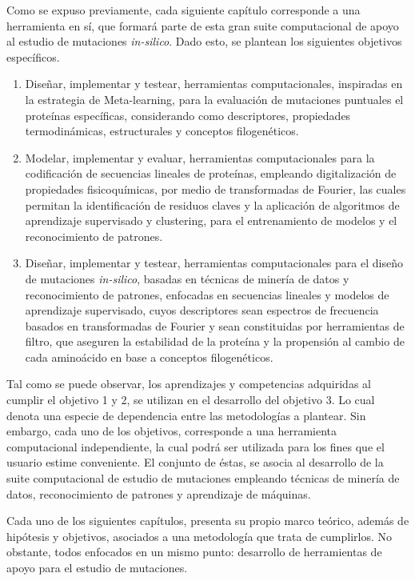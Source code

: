 Como se expuso previamente, cada siguiente capítulo corresponde a una herramienta en sí, que formará parte de esta gran suite computacional de apoyo al estudio de mutaciones \textit{in-silico}. Dado esto, se plantean los siguientes objetivos específicos.

\begin{enumerate}
	
	\item Diseñar, implementar y testear, herramientas computacionales, inspiradas en la estrategia de Meta-learning, para la evaluación de mutaciones puntuales el proteínas específicas, considerando como descriptores, propiedades termodinámicas, estructurales y conceptos filogenéticos. 
	
	\item Modelar, implementar y evaluar, herramientas computacionales para la codificación de secuencias lineales de proteínas, empleando digitalización de propiedades fisicoquímicas, por medio de transformadas de Fourier, las cuales permitan la identificación de residuos claves y la aplicación de algoritmos de aprendizaje supervisado y clustering, para el entrenamiento de modelos y el reconocimiento de patrones.
	
	\item Diseñar, implementar y testear, herramientas computacionales para el diseño de mutaciones \textit{in-silico}, basadas en técnicas de minería de datos y reconocimiento de patrones, enfocadas en secuencias lineales y modelos de aprendizaje supervisado, cuyos descriptores sean espectros de frecuencia basados en transformadas de Fourier y sean constituidas por herramientas de filtro, que aseguren la estabilidad de la proteína y la propensión al cambio de cada aminoácido en base a conceptos filogenéticos.
	
\end{enumerate}

Tal como se puede observar, los aprendizajes y competencias adquiridas al cumplir el objetivo 1 y 2, se utilizan en el desarrollo del objetivo 3. Lo cual denota una especie de dependencia entre las metodologías a plantear. Sin embargo, cada uno de los objetivos, corresponde a una herramienta computacional independiente, la cual podrá ser utilizada para los fines que el usuario estime conveniente. El conjunto de éstas, se asocia al desarrollo de la suite computacional de estudio de mutaciones empleando técnicas de minería de datos, reconocimiento de patrones y aprendizaje de máquinas.

Cada uno de los siguientes capítulos, presenta su propio marco teórico, además de hipótesis y objetivos, asociados a una metodología que trata de cumplirlos. No obstante, todos enfocados en un mismo punto: desarrollo de herramientas de apoyo para el estudio de mutaciones.